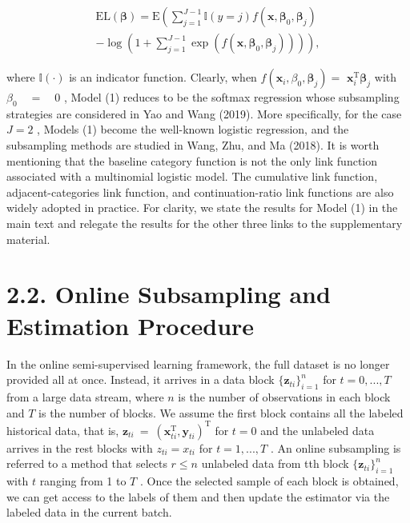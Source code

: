 \documentclass[
  10
]{article}
\begin{document}
\[
\begin{array} { l } { \displaystyle \mathrm { E L } ( \pmb { \beta } ) = \mathrm { E } \left( \sum _ { j = 1 } ^ { J - 1 } \mathbb { I } ( y = j ) f ( \pmb { x } , \pmb { \beta } _ { 0 } , \pmb { \beta } _ { j } ) \right. } \\ { \displaystyle \left. - \log \left( 1 + \sum _ { j = 1 } ^ { J - 1 } \exp \left( f ( \pmb { x } , \pmb { \beta } _ { 0 } , \pmb { \beta } _ { j } ) \right) \right) \right) , } \end{array}
\]

where \(\mathbb { I } ( \cdot )\) is an indicator function. Clearly,
when
\(f ( \pmb { x } _ { i } , \beta _ { 0 } , \pmb { \beta } _ { j } ) =\)
\(\pmb { x } _ { i } ^ { \mathrm { T } } \pmb { \beta } _ { j }\) with
\(\beta _ { 0 } \quad = \quad 0\) , Model (1) reduces to be the softmax
regression whose subsampling strategies are considered in Yao and Wang
(2019). More specifically, for the case \(J = 2\) , Models (1) become
the well-known logistic regression, and the subsampling methods are
studied in Wang, Zhu, and Ma (2018). It is worth mentioning that the
baseline category function is not the only link function associated with
a multinomial logistic model. The cumulative link function,
adjacent-categories link function, and continuation-ratio link functions
are also widely adopted in practice. For clarity, we state the results
for Model (1) in the main text and relegate the results for the other
three links to the supplementary material.

\section{2.2. Online Subsampling and Estimation
Procedure}\label{online-subsampling-and-estimation-procedure}

In the online semi-supervised learning framework, the full dataset is no
longer provided all at once. Instead, it arrives in a data block
\(\{ \boldsymbol { z } _ { t i } \} _ { i = 1 } ^ { n }\) for
\(t = 0 , . . . , T\) from a large data stream, where \(n\) is the
number of observations in each block and \(T\) is the number of blocks.
We assume the first block contains all the labeled historical data, that
is,
\(\boldsymbol { z } _ { t i } ~ = ~ ( \boldsymbol { x } _ { t i } ^ { \mathrm { T } } , \boldsymbol { y } _ { t i } ) ^ { \mathrm { T } }\)
for \(t = 0\) and the unlabeled data arrives in the rest blocks with
\(z _ { t i } = x _ { t i }\) for \(t = 1 , . . . , T\) . An online
subsampling is referred to a method that selects \(r \leq n\) unlabeled
data from tth block
\(\{ \boldsymbol { z } _ { t i } \} _ { i = 1 } ^ { n }\) with \(t\)
ranging from 1 to \(T\) . Once the selected sample of each block is
obtained, we can get access to the labels of them and then update the
estimator via the labeled data in the current batch.
\end{document}
